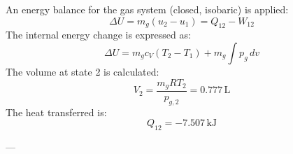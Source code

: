 An energy balance for the gas system (closed, isobaric) is applied:  
\[
\Delta U = m_g (u_2 - u_1) = Q_{12} - W_{12}
\]  
The internal energy change is expressed as:  
\[
\Delta U = m_g c_V (T_2 - T_1) + m_g \int p_g \, dv
\]  
The volume at state 2 is calculated:  
\[
V_2 = \frac{m_g R T_2}{p_{g,2}} = 0.777 \, \text{L}
\]  
The heat transferred is:  
\[
Q_{12} = -7.507 \, \text{kJ}
\]  

---